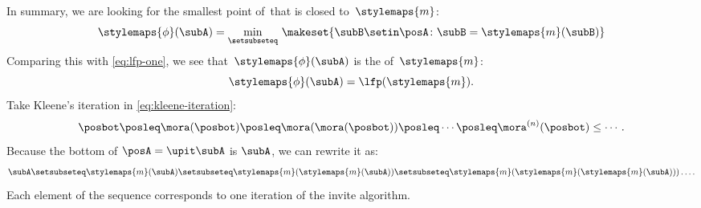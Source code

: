 In summary, we are looking for the smallest point of~\posA that is closed to~$\stylemaps{m}$:
%
\begin{equation}
    \stylemaps{\phi}(\subA) = \min_{\setsubseteq}\, \makeset{ \subB \setin \posA \colon \subB = \stylemaps{m}(\subB) }
\end{equation}
Comparing this with \cref{eq:lfp-one}, we see that~$\stylemaps{\phi}(\subA)$ is the  of~$\stylemaps{m}$:
\begin{equation}
    \stylemaps{\phi}(\subA) = \lfp(\stylemaps{m}).
\end{equation}
%
Take Kleene's iteration in \cref{eq:kleene-iteration}:
\begin{equation}
    \posbot\posleq \mora(\posbot)\posleq \mora(\mora(\posbot))\posleq\cdots\posleq \mora^{(n)}(\posbot)\leq\cdots.
\end{equation}
Because the bottom of $\posA = \upit \subA$ is $\subA$, we can rewrite it as:
\begin{equation}
    \subA \setsubseteq  \stylemaps{m}(\subA ) \setsubseteq \stylemaps{m}(\stylemaps{m}(\subA)) \setsubseteq \stylemaps{m}(\stylemaps{m}(\stylemaps{m}(\subA))) \ldots .
\end{equation}
Each element of the sequence corresponds to one iteration of the invite algorithm.

